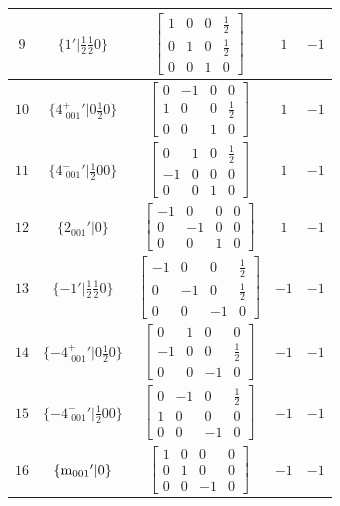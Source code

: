 \documentclass[fleqn,8pt]{jsarticle}
\begin{document}
\begin{longtable}{ccccc}
$ 9 $ & $ \{1{}'|\frac{1}{2} \frac{1}{2} 0\} $ & $ \begin{bmatrix} 1 & 0 & 0 & \frac{1}{2} \\ 0 & 1 & 0 & \frac{1}{2} \\ 0 & 0 & 1 & 0 \end{bmatrix} $ & $ 1 $ & $ -1 $ \\ \hline
$ 10 $ & $ \{4^{+}_{\,\,001}{}'|0 \frac{1}{2} 0\} $ & $ \begin{bmatrix} 0 & -1 & 0 & 0 \\ 1 & 0 & 0 & \frac{1}{2} \\ 0 & 0 & 1 & 0 \end{bmatrix} $ & $ 1 $ & $ -1 $ \\ \hline
$ 11 $ & $ \{4^{-}_{\,\,001}{}'|\frac{1}{2} 0 0\} $ & $ \begin{bmatrix} 0 & 1 & 0 & \frac{1}{2} \\ -1 & 0 & 0 & 0 \\ 0 & 0 & 1 & 0 \end{bmatrix} $ & $ 1 $ & $ -1 $ \\ \hline
$ 12 $ & $ \{2{}_{001}{}'|0\} $ & $ \begin{bmatrix} -1 & 0 & 0 & 0 \\ 0 & -1 & 0 & 0 \\ 0 & 0 & 1 & 0 \end{bmatrix} $ & $ 1 $ & $ -1 $ \\ \hline
$ 13 $ & $ \{-1{}'|\frac{1}{2} \frac{1}{2} 0\} $ & $ \begin{bmatrix} -1 & 0 & 0 & \frac{1}{2} \\ 0 & -1 & 0 & \frac{1}{2} \\ 0 & 0 & -1 & 0 \end{bmatrix} $ & $ -1 $ & $ -1 $ \\ \hline
$ 14 $ & $ \{-4^{+}_{\,\,001}{}'|0 \frac{1}{2} 0\} $ & $ \begin{bmatrix} 0 & 1 & 0 & 0 \\ -1 & 0 & 0 & \frac{1}{2} \\ 0 & 0 & -1 & 0 \end{bmatrix} $ & $ -1 $ & $ -1 $ \\ \hline
$ 15 $ & $ \{-4^{-}_{\,\,001}{}'|\frac{1}{2} 0 0\} $ & $ \begin{bmatrix} 0 & -1 & 0 & \frac{1}{2} \\ 1 & 0 & 0 & 0 \\ 0 & 0 & -1 & 0 \end{bmatrix} $ & $ -1 $ & $ -1 $ \\ \hline
$ 16 $ & $ \{{\rm m}_{001}{}'|0\} $ & $ \begin{bmatrix} 1 & 0 & 0 & 0 \\ 0 & 1 & 0 & 0 \\ 0 & 0 & -1 & 0 \end{bmatrix} $ & $ -1 $ & $ -1 $ \\
\end{longtable}
\end{document}
